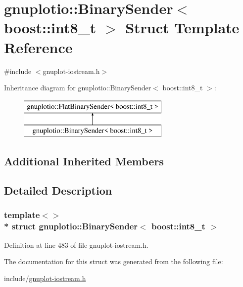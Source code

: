 \hypertarget{structgnuplotio_1_1_binary_sender_3_01boost_1_1int8__t_01_4}{}\section{gnuplotio\+:\+:Binary\+Sender$<$ boost\+:\+:int8\+\_\+t $>$ Struct Template Reference}
\label{structgnuplotio_1_1_binary_sender_3_01boost_1_1int8__t_01_4}


{\ttfamily \#include $<$gnuplot-\/iostream.\+h$>$}

Inheritance diagram for gnuplotio\+:\+:Binary\+Sender$<$ boost\+:\+:int8\+\_\+t $>$\+:\begin{figure}[H]
\begin{center}
\leavevmode
\includegraphics[height=2.000000cm]{structgnuplotio_1_1_binary_sender_3_01boost_1_1int8__t_01_4}
\end{center}
\end{figure}
\subsection*{Additional Inherited Members}


\subsection{Detailed Description}
\subsubsection*{template$<$$>$\\*
struct gnuplotio\+::\+Binary\+Sender$<$ boost\+::int8\+\_\+t $>$}



Definition at line 483 of file gnuplot-\/iostream.\+h.



The documentation for this struct was generated from the following file\+:\begin{DoxyCompactItemize}
\item 
include/\hyperlink{gnuplot-iostream_8h}{gnuplot-\/iostream.\+h}\end{DoxyCompactItemize}
